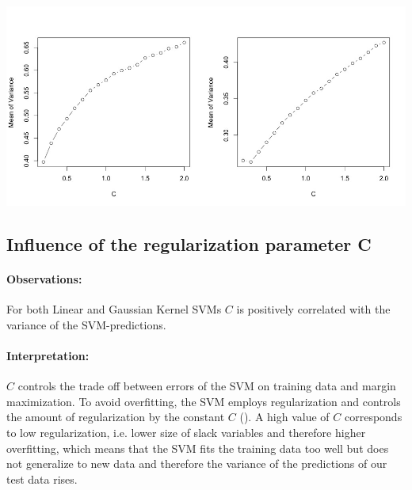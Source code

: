 \documentclass[a1,portrait]{a0poster}
\begin{document}
\begin{multicols}{3}
\begin{center}\vspace{1cm}
\includegraphics[width=1\linewidth]{abb/c.jpg}
\label{fig3}
\end{center}\vspace{1cm}

\subsection*{Influence of the regularization parameter C}
\paragraph{Observations:}
For both Linear and Gaussian Kernel SVMs $C$ is positively correlated with the variance of the SVM-predictions.
\paragraph{Interpretation:}
$C$ controls the trade off between errors of the SVM on training data and margin maximization. To avoid overfitting, the SVM employs regularization and controls the amount of regularization by the constant $C$ (\cite{hastie_elements_2005}). A high value of $C$ corresponds to low regularization, i.e. lower size of slack variables and therefore higher overfitting, which means that the SVM fits the training data too well but does not generalize to new data and therefore the variance of the predictions of our test data rises.



\end{multicols}
\end{document}
